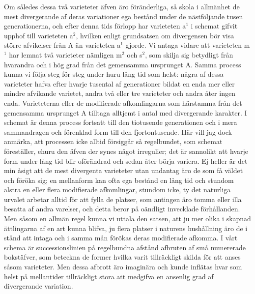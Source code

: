 Om således dessa två varieteter äfven äro föränderliga, så skola i allmänhet de mest divergerande af deras variationer ega bestånd under de nästföljande tusen generationerna, och efter denna tids förlopp har varieteten a${}^1$ i schemat gifvit upphof till varieteten a${}^2$, hvilken enligt grundsatsen om divergensen bör visa större afvikelser från A än varieteten a${}^1$ gjorde. Vi antaga vidare att varieteten m${}^1$ har lemnat två varieteter nämligen m${}^2$ och s${}^2$, som skilja sig betydligt från hvarandra och i hög grad från det gemensamma ursprunget A. Samma process kunna vi följa steg för steg under huru lång tid som helst: några af dessa varieteter hafva efter hvarje tusental af generationer bildat en enda mer eller mindre afvikande varietet, andra två eller tre varieteter och andra åter ingen enda. Varieteterna eller de modifierade afkomlingarna som härstamma från det gemensamma ursprunget A tilltaga alltjemt i antal med divergerande karakter. I schemat är denna process fortsatt till den tiotusende generationen och i mera sammandragen och förenklad form till den fjortontusende.
Här vill jag dock anmärka, att processen icke alltid försiggår så regelbundet, som schemat föreställer, ehuru den äfven der synes något irregulier; det är sannolikt att hvarje form under lång tid blir oförändrad och sedan åter börja variera. Ej heller är det min åsigt att de mest divergenta varieteter utan undantag äro de som få väldet och föröka sig; en mellanform kan ofta ega bestånd en lång tid och stundom alstra en eller flera modifierade afkomlingar, stundom icke, ty det naturliga urvalet arbetar alltid för att fylla de platser, som antingen äro tomma eller illa besatta af andra varelser, och detta beror på oändligt invecklade förhållanden. Men såsom en allmän regel kunna vi uttala den satsen, att ju mer olika i skapnad ättlingarna af en art kunna blifva, ju flera platser i naturens hushållning äro de i stånd att intaga och i samma mån förökas deras modifierade afkomma. I vårt schema är successionslinien på regelbundna afstånd afbruten af små numererade bokstäfver, som beteckna de former hvilka varit tillräckligt skilda för att anses såsom varieteter. Men dessa afbrott äro imaginära och kunde inflätas hvar som helst på mellantider tillräckligt stora att medgifva en ansenlig grad af divergerande variation.

